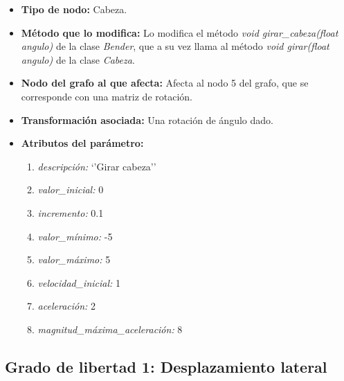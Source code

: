 \documentclass{article}
\begin{document}
	\begin{itemize}
		\item \textbf{Tipo de nodo: } Cabeza. 
		\item \textbf{Método que lo modifica: } Lo modifica el método \textit{void girar\_cabeza(float angulo)} de la clase \textit{Bender}, que a su vez llama al método \textit{void girar(float angulo)} de la clase \textit{Cabeza}.
		\item \textbf{Nodo del grafo al que afecta: } Afecta al nodo 5 del grafo, que se corresponde con una matriz de rotación. 
		\item \textbf{Transformación asociada: } Una rotación de ángulo dado.
		\item \textbf{Atributos del parámetro: }
		\begin{enumerate} 
			\item \textit{descripción: } `'Girar cabeza''
			\item  \textit{valor\_inicial:} 0
			\item \textit{incremento: } 0.1
			\item \textit{valor\_mínimo: } -5
			\item \textit{valor\_máximo: } 5
			\item \textit{velocidad\_inicial: } 1
			\item \textit{aceleración: } 2
			\item \textit{magnitud\_máxima\_aceleración: }  8
		\end{enumerate}
	\end{itemize}


	\subsection{Grado de libertad 1: Desplazamiento lateral}
	
\end{document}

